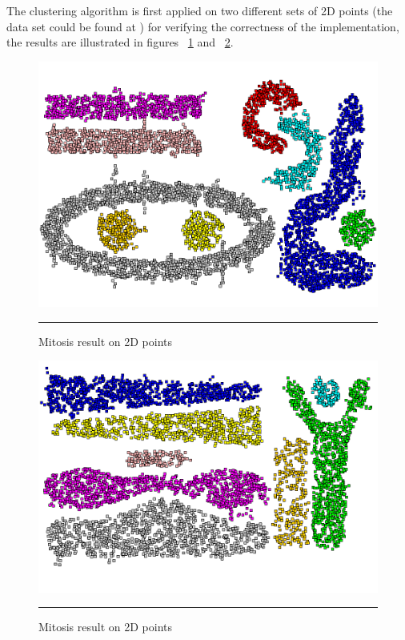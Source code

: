 The clustering algorithm is first applied on two different sets of 2D points (the data set could be found at \citep{Mitosis_2}) for verifying the correctness of the implementation, the results are illustrated in figures ~\ref{fig:mitosis_7} and ~\ref{fig:mitosis_8}.
\begin{figure}[htbp]
	\centering
		\includegraphics{./Figures/Mitosis_7.png}
		\rule{25em}{0.3pt}
	\caption[Mitosis result on 2D points]{Mitosis result on 2D points}
	\label{fig:mitosis_7}
\end{figure}

\begin{figure}[htbp]
	\centering
		\includegraphics{./Figures/Mitosis_8.png}
		\rule{25em}{0.3pt}
	\caption[Mitosis result on 2D points]{Mitosis result on 2D points}
	\label{fig:mitosis_8}
\end{figure}

